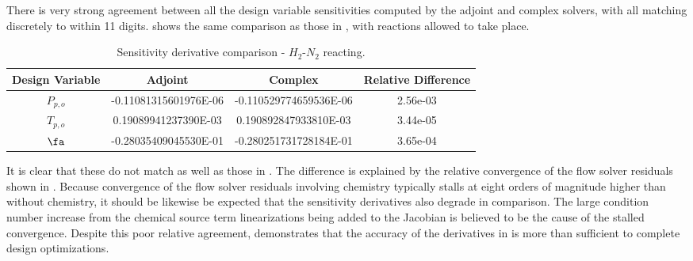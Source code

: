 There is very strong agreement between all the design variable sensitivities
computed by the adjoint and complex solvers, with all matching discretely to
within 11 digits.   shows the same comparison as
those in , with reactions allowed to take place.
\begin{table}[h]
  \centering
  \begin{tabular}{c|c|c|c}
    Design Variable & Adjoint & Complex & Relative Difference\\
    \hline
    $P_{p,o}$ & -0.11081315601976E-06 & -0.110529774659536E-06 & 2.56e-03 \\
    $T_{p,o}$ &  0.19089941237390E-03 &  0.190892847933810E-03 & 3.44e-05 \\
    $\fa$     & -0.28035409045530E-01 & -0.280251731728184E-01 & 3.65e-04
  \end{tabular}
  \caption{Sensitivity derivative comparison - $H_2$-$N_2$ reacting.}
  \label{tab:react-deriv-check}
\end{table}
It is clear that these do not match as well as those in
.  The difference is explained
by the relative convergence of the flow solver residuals shown in
.  Because convergence of the flow solver residuals
involving chemistry typically stalls at eight orders of magnitude higher than
without chemistry, it should be likewise be expected that the sensitivity
derivatives also degrade in comparison.  The large condition number increase
from the chemical source term linearizations being added to the Jacobian is
believed to be the cause of the stalled convergence. Despite this poor relative
agreement,  demonstrates that the accuracy of
the derivatives in  is more than sufficient to
complete design optimizations.
